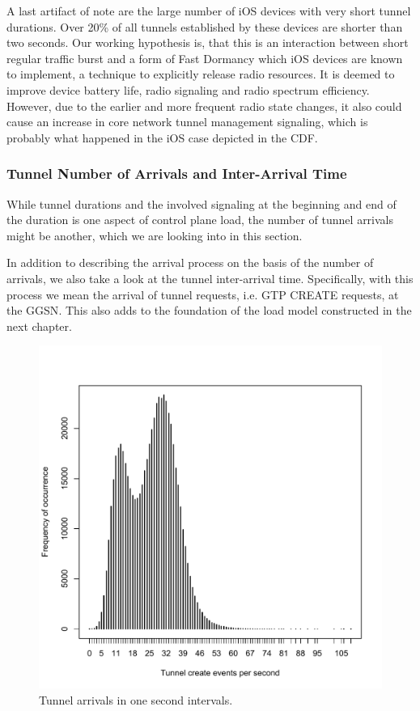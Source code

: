 A last artifact of note are the large number of iOS devices with very short tunnel durations. Over 20\% of all tunnels established by these devices are shorter than two seconds. Our working hypothesis is, that this is an interaction between short regular traffic burst and a form of Fast Dormancy \cite{gsma2011fdbestpract} which iOS devices are known to implement, a technique to explicitly release radio resources. It is deemed to improve device battery life, radio signaling and radio spectrum efficiency. However, due to the earlier and more frequent radio state changes, it also could cause an increase in core network tunnel management signaling, which is probably what happened in the iOS case depicted in the CDF.



\subsubsection{Tunnel Number of Arrivals and Inter-Arrival Time}

While tunnel durations and the involved signaling at the beginning and end of the duration is one aspect of control plane load, the number of tunnel arrivals might be another, which we are looking into in this section.

In addition to describing the arrival process on the basis of the number of arrivals, we also take a look at the tunnel inter-arrival time. Specifically, with this process we mean the arrival of tunnel requests, i.e. GTP CREATE requests, at the \ac{GGSN}. This also adds to the foundation of the load model constructed in the next chapter. 

\begin{figure}
	\centering
	\includegraphics[width=\columnwidth]{images/IMC2013/create_freq.pdf}
	\caption{Tunnel arrivals in one second intervals.}
	\label{fig:freq-arrivals}
\end{figure}

